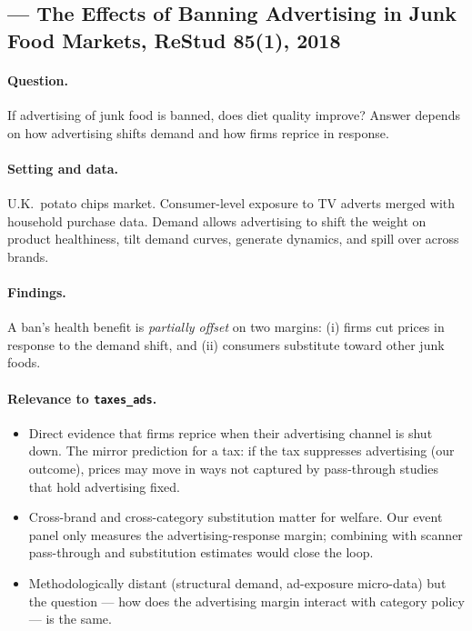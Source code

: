 \subsection*{\citet{dubois_griffith_oconnell_junk_food_ads}
  --- The Effects of Banning Advertising in Junk Food Markets,
  ReStud 85(1), 2018}

\paragraph{Question.} If advertising of junk food is banned,
does diet quality improve? Answer depends on how advertising
shifts demand and how firms reprice in response.

\paragraph{Setting and data.} U.K.\ potato chips market.
Consumer-level exposure to TV adverts merged with household
purchase data. Demand allows advertising to shift the weight
on product healthiness, tilt demand curves, generate dynamics,
and spill over across brands.

\paragraph{Findings.} A ban's health benefit is \emph{partially
offset} on two margins: (i) firms cut prices in response to the
demand shift, and (ii) consumers substitute toward other junk
foods.

\paragraph{Relevance to \texttt{taxes\_ads}.}
\begin{itemize}
  \item Direct evidence that firms reprice when their
        advertising channel is shut down. The mirror prediction
        for a tax: if the tax suppresses advertising (our
        outcome), prices may move in ways not captured by
        pass-through studies that hold advertising fixed.
  \item Cross-brand and cross-category substitution matter for
        welfare. Our event panel only measures the
        advertising-response margin; combining with scanner
        pass-through and substitution estimates would close the
        loop.
  \item Methodologically distant (structural demand, ad-exposure
        micro-data) but the question --- how does the
        advertising margin interact with category policy --- is
        the same.
\end{itemize}
